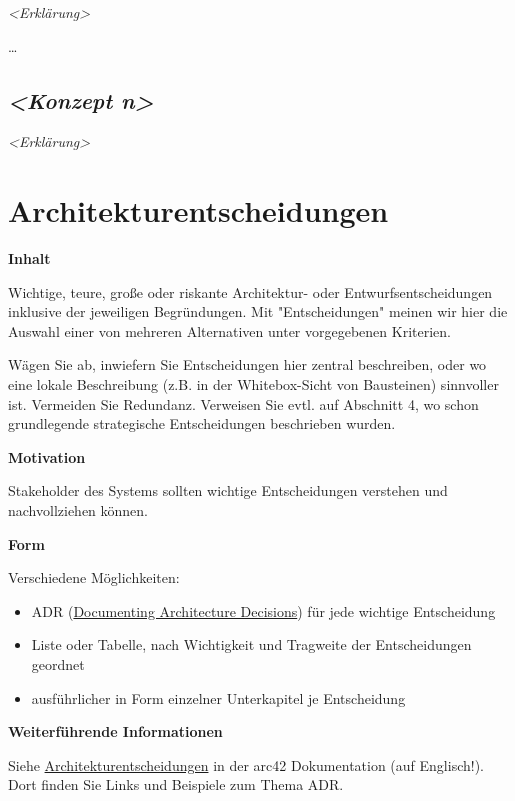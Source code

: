 \documentclass[
]{article}
\begin{document}
\emph{\textless Erklärung\textgreater{}}

\ldots\hspace{0pt}

\subsection{\texorpdfstring{\emph{\textless Konzept
n\textgreater{}}}{\textless Konzept n\textgreater{}}}\label{_konzept_n}

\emph{\textless Erklärung\textgreater{}}

\section{Architekturentscheidungen}\label{section-design-decisions}

\textbf{Inhalt}

Wichtige, teure, große oder riskante Architektur- oder
Entwurfsentscheidungen inklusive der jeweiligen Begründungen. Mit
"Entscheidungen" meinen wir hier die Auswahl einer von mehreren
Alternativen unter vorgegebenen Kriterien.

Wägen Sie ab, inwiefern Sie Entscheidungen hier zentral beschreiben,
oder wo eine lokale Beschreibung (z.B. in der Whitebox-Sicht von
Bausteinen) sinnvoller ist. Vermeiden Sie Redundanz. Verweisen Sie evtl.
auf Abschnitt 4, wo schon grundlegende strategische Entscheidungen
beschrieben wurden.

\textbf{Motivation}

Stakeholder des Systems sollten wichtige Entscheidungen verstehen und
nachvollziehen können.

\textbf{Form}

Verschiedene Möglichkeiten:

\begin{itemize}
\item
  ADR
  (\href{https://cognitect.com/blog/2011/11/15/documenting-architecture-decisions}{Documenting
  Architecture Decisions}) für jede wichtige Entscheidung
\item
  Liste oder Tabelle, nach Wichtigkeit und Tragweite der Entscheidungen
  geordnet
\item
  ausführlicher in Form einzelner Unterkapitel je Entscheidung
\end{itemize}

\textbf{Weiterführende Informationen}

Siehe
\href{https://docs.arc42.org/section-9/}{Architekturentscheidungen} in
der arc42 Dokumentation (auf Englisch!). Dort finden Sie Links und
Beispiele zum Thema ADR.
\end{document}
